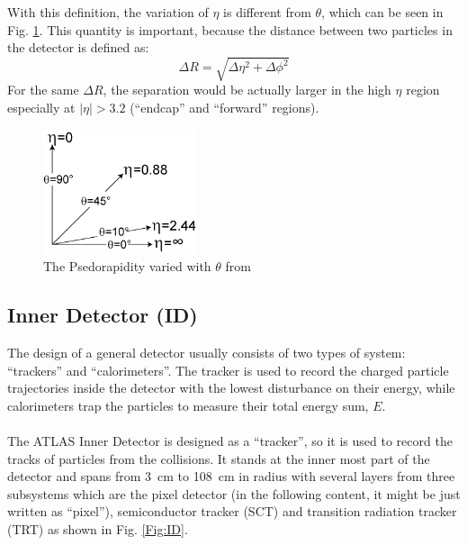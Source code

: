 With this definition, the variation of $\eta$ is different from $\theta$, which can be seen in Fig. \ref{Fig:pseudorapidity}. This quantity is important, because the distance between two particles in the detector is defined as:
\begin{equation}
\Delta R= \sqrt{\Delta \eta^{2}+\Delta \phi^{2}}
\end{equation}
For the same $\Delta R$, the separation would be actually larger in the high $\eta$ region especially at $|\eta|>3.2$ (``endcap'' and ``forward'' regions).  
\begin{figure}[!h]                
	\includegraphics[width=0.4\textwidth]{Chapter2/pseudorapidity.png}
	\centering
	\begin{center}
		\caption{The Psedorapidity varied with $\theta$ from \cite{pseudorapidity_wiki}}
		\label{Fig:pseudorapidity}            
	\end{center}
\end{figure}

\subsection{Inner Detector (ID) \cite{CERN-LHCC-97-016}}
The design of a general detector usually consists of two types of system: ``trackers'' and ``calorimeters''. The tracker is used to record the charged particle trajectories inside the detector with the lowest disturbance on their energy, while calorimeters trap the particles to measure their total energy sum, $E$. 
\\
\\The ATLAS Inner Detector is designed as a ``tracker'', so it is used to record the tracks of particles from the collisions. It stands at the inner most part of the detector and spans from 3~cm to 108~cm in radius with several layers from three subsystems which are the pixel detector (in the following content, it might be just written as ``pixel''), semiconductor tracker (SCT) and transition radiation tracker (TRT) as shown in Fig. \ref{Fig:ID}. 

